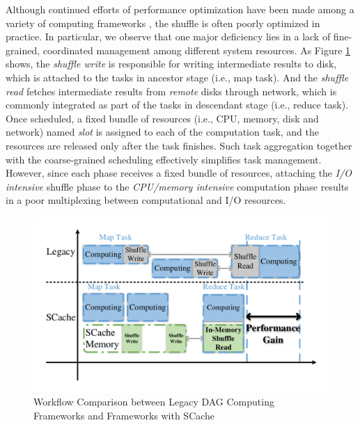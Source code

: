 Although continued efforts of performance optimization have been made among a variety of computing frameworks \cite{babu, tachyon, pacman, quincy, delay}, the shuffle is often poorly optimized in practice.
In particular, we observe that one major deficiency lies in a lack of fine-grained, coordinated management among different system resources.
As Figure \ref{fig:workflow} shows, the \textit{shuffle write} is responsible for writing intermediate results to disk, which is attached to the tasks in ancestor stage (i.e., map task).  And the \textit{shuffle read} fetches intermediate results from \emph{remote} disks through network, which is commonly integrated as part of the tasks in descendant stage (i.e., reduce task).  Once scheduled, a fixed bundle of resources (i.e., CPU, memory, disk and network) named \textit{slot} is assigned to each of the computation task, and the resources are released only after the task finishes.
Such task aggregation together with the coarse-grained scheduling effectively simplifies task management.
However, since each phase receives a fixed bundle of resources, attaching the \emph{I/O intensive} shuffle phase to the \emph{CPU/memory intensive} computation phase results in a poor multiplexing between computational and I/O resources.
\begin{figure}
	\centering
	\includegraphics[width=\linewidth]{fig/workflow}
	\caption{Workflow Comparison between Legacy DAG Computing Frameworks and Frameworks with SCache}
	\label{fig:workflow}
\end{figure}
